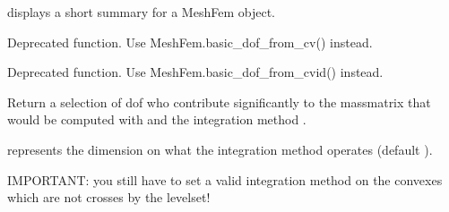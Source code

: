 \documentclass[a4paper,11pt,english]{sphinxmanual}
\begin{document}
\begin{fulllineitems}

\begin{fulllineitems}
\label{\detokenize{python/cmdref_MeshFem:getfem.MeshFem.display}}
displays a short summary for a MeshFem object.

\end{fulllineitems}


\begin{fulllineitems}
\label{\detokenize{python/cmdref_MeshFem:getfem.MeshFem.dof_from_cv}}
Deprecated function. Use MeshFem.basic\_dof\_from\_cv() instead.

\end{fulllineitems}


\begin{fulllineitems}
\label{\detokenize{python/cmdref_MeshFem:getfem.MeshFem.dof_from_cvid}}
Deprecated function. Use MeshFem.basic\_dof\_from\_cvid() instead.

\end{fulllineitems}


\begin{fulllineitems}
\label{\detokenize{python/cmdref_MeshFem:getfem.MeshFem.dof_from_im}}
Return a selection of dof who contribute significantly to the
mass\sphinxhyphen{}matrix that would be computed with  and the integration
method .

 represents the dimension on what the integration method
operates (default ).

IMPORTANT: you still have to set a valid integration method on
the convexes which are not crosses by the levelset!


\end{fulllineitems}
\end{fulllineitems}
\end{document}
